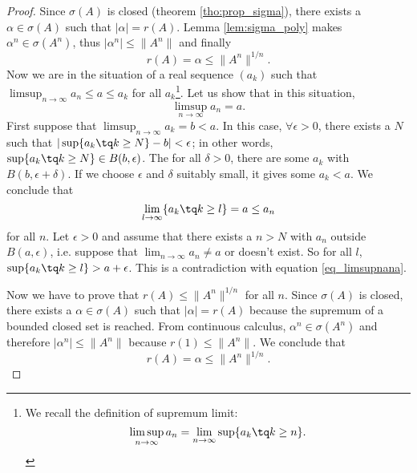 \begin{proof}
	Since $\sigma(A)$ is closed (theorem \ref{tho:prop_sigma}), there exists a $\alpha\in\sigma(A)$ such that $|\alpha|=r(A)$. Lemma \ref{lem:sigma_poly} makes $\alpha^n\in\sigma(A^n)$, thus $|\alpha^n|\leq\|A^n\|$ and finally
	\begin{equation}
	  r(A)=\alpha\leq\|A^n\|^{1/n}.
	\end{equation}
	Now we are in the situation of a real sequence $(a_k)$ such that $\limsup_{n\to\infty} a_n\leq a \leq a_k$ for all $a_k$\footnote{We recall the definition of supremum limit:
	\[ 
	  \limsup_{n\to\infty} a_n=\lim_{n\to\infty}\sup\{ a_k\tq k\geq n \}.
	\]
	}.		%
	Let us show that in this situation, 
	\begin{equation} \label{eq_limsupnana}
	\limsup_{n\to\infty} a_n=a.
	\end{equation}
	 First suppose that $\limsup_{n\to\infty}a_k=b<a$.  In this case, $\forall \epsilon>0$, there exists a $N$ such that
	$  | \sup\{ a_k\tq k\geq N \}-b |<\epsilon$;
	in other words, $\sup\{ a_k\tq k\geq N \}\in B(b,\epsilon)$. The for all $\delta>0$, there are some $a_k$ with $B(b,\epsilon+\delta)$. If we choose $\epsilon$ and $\delta$ suitably small, it gives some $a_k<a$. We conclude that
	\[ 
	  \lim_{l\to\infty}\{ a_k\tq k\geq l \}=a\leq a_n
	\]
	for all $n$. Let $\epsilon>0$ and assume that there exists a $n>N$ with $a_n$ outside $B(a,\epsilon)$, i.e. suppose that $\lim_{n\to\infty}a_n\neq a$ or doesn't exist. So for all $l$, $\sup\{ a_k\tq k\geq l \}>a+\epsilon$. This is a contradiction with equation \eqref{eq_limsupnana}.

	Now we have to prove that $r(A)\leq \| A^n \|^{1/n}$ for all $n$. Since $\sigma(A)$ is closed, there exists a $\alpha\in\sigma(A)$ such that $| \alpha |=r(A)$ because the supremum of a bounded closed set is reached\angl. From continuous calculus,  $\alpha^n\in\sigma(A^n)$ and therefore $| \alpha^n |\leq\| A^n \|$ because $r(1)\leq \| A^n \|$. We conclude that 
	\[ 
	  r(A)=\alpha\leq\| A^n \|^{1/n}.
	\]
\end{proof}

